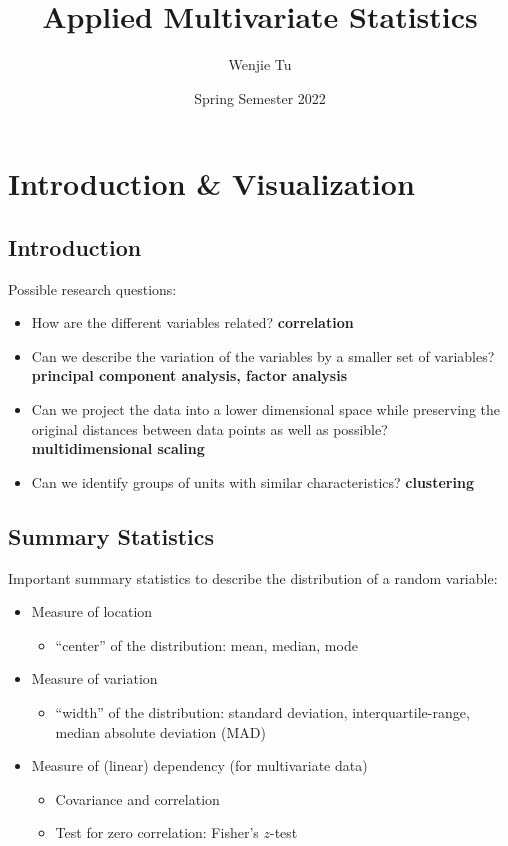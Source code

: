 \documentclass[a4paper]{article}
\title{%
    Applied Multivariate Statistics
}
\author{Wenjie Tu}
\date{Spring Semester 2022}
\begin{document}

\section{Introduction \& Visualization}

\subsection{Introduction}

Possible research questions:
\begin{itemize}
    \item How are the different variables related? 
    \textbf{correlation}
    \item Can we describe the variation of the variables by a smaller set of variables? 
    \textbf{principal component analysis, factor analysis}
    \item Can we project the data into a lower dimensional space while preserving the original distances between data points as well as possible? 
    \textbf{multidimensional scaling}
    \item Can we identify groups of units with similar characteristics?
    \textbf{clustering}
\end{itemize}

\subsection{Summary Statistics}

Important summary statistics to describe the distribution of a random variable:
\begin{itemize}
    \item Measure of location
    \begin{itemize}
        \item ``center'' of the distribution: mean, median, mode
    \end{itemize}
    \item Measure of variation
    \begin{itemize}
        \item ``width'' of the distribution: standard deviation, interquartile-range, median absolute deviation (MAD)
    \end{itemize}
    \item Measure of (linear) dependency (for multivariate data)
    \begin{itemize}
        \item Covariance and correlation
        \item Test for zero correlation: Fisher's $z$-test
    \end{itemize}
\end{itemize}
\end{document}
